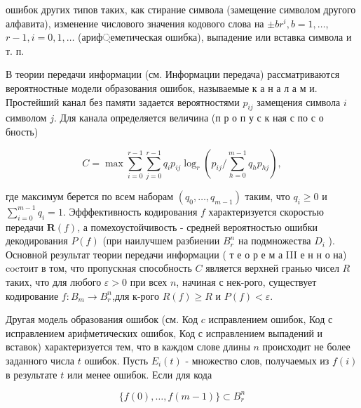\documentclass[10pt]{article}
\begin{document}
ошибок других типов таких, как стирание символа (замещение символом другого алфавита), изменение числового значения кодового слова на $\pm b r^{i}, b=1, \ldots$, $r-1, i=0,1, \ldots$ (ариф্еметическая ошибка), выпадение или вставка символа и т. п.



В теории передачи информации (см. Информации передача) рассматриваются вероятностные модели образования ошибок, называемые к а н а л а м и. Простейший канал без памяти задается вероятностями $p_{i j}$ замещения символа $i$ символом $j$. Для канала определяется величина (п р о п у с к ная с по с о бность)



\[

C=\max \sum_{i=0}^{r-1} \sum_{j=0}^{r-1} q_{i} p_{i j} \log _{r}\left(p_{i j} / \sum_{h=0}^{m-1} q_{h} p_{h j}\right),

\]



где максимум берется по всем наборам $\left(q_{0}, \ldots, q_{m-1}\right)$ таким, что $q_{i} \geqslant 0$ и $\sum_{i=0}^{m-1} q_{i}=1$. Эфффективность кодирования $f$ характеризуется скоростью передачи $\boldsymbol{R}(f)$, а помехоустойчивость - средней вероятностью ошибки декодирования $P(f)$ (при наилучшем разбиении $B_{r}^{n}$ на подмножества $D_{i}$ ). Основной результат теории передачи информации ( т е о р е м а III е н н о на) cocтоит в том, что пропускная способность $C$ является верхней гранью чисел $R$ таких, что для любого $\varepsilon>0$ при всех $n$, начиная с нек-рого, существует кодирование $f: B_{m} \rightarrow B_{r}^{n}$,для к-рого $R(f) \geqslant R$ и $P(f)<\varepsilon$.



Другая модель образования ошибок (см. Код $c$ исправлением ошибок, Код с исправлением арифметических ошибок, Код с исправлением выпадений и вставок) характеризуется тем, что в каждом слове длины $n$ происходит не более заданного числа $t$ ошибок. Пусть $E_{i}(t)$ - множество слов, получаемых из $f(i)$ в результате $t$ или менее ошибок. Если для кода



\[

\{f(0), \ldots, f(m-1)\} \subset B_{r}^{n}

\]
\end{document}
